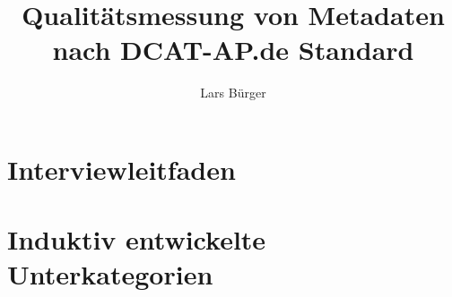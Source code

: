 \documentclass[german]{htwg-report}
\begin{document}


\title[Qualitätsmessung von Metadaten nach DCAT-AP.de Standard]{Qualitätsmessung von Metadaten nach DCAT-AP.de Standard}

\author{Lars Bürger}


%          








\tableofcontents

\clearpage
{}



\appendix

%

\glsaddall
\printglossary[type=\acronymtype, title=Abkürzungsverzeichnis, nonumberlist]
\clearpage
\listoffigures
{}
\listoftables
{}
\clearpage
\printbibliography[heading=bibintoc]

\newpage

\appendix

\chapter{Interviewleitfaden}
\label{app:interviewleitfaden}


\chapter{Induktiv entwickelte Unterkategorien}
\label{app:unterkategorien}

\end{document}
